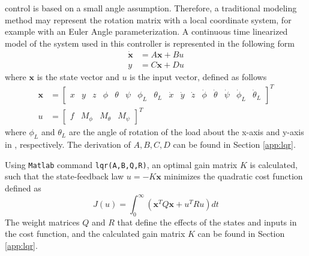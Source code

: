  control is based on a small angle assumption. Therefore, a traditional modeling method may represent the rotation matrix with a local coordinate system, for example with an Euler Angle parameterization. 
A continuous time linearized model of the system used in this controller is represented in the following form 
\begin{align}\label{eq:ss}
\mathbf{\dot{x} }&=A\mathbf{x}+Bu\\
y&=C\mathbf{x}+Du
\end{align}
where $ \mathbf{x} $ is the state vector and $ u $ is the input vector, defined as follows
\begin{align}\label{eq:state}
\mathbf{x}&=\begin{bmatrix}
x&y&z&\phi&\theta&\psi&\phi_L&\theta_L&\dot{x}&\dot{y}&\dot{z}&\dot{\phi}&\dot{\theta}&\dot{\psi}&\dot{\phi}_L&\dot{\theta}_L
\end{bmatrix}^T\\
	u&=\begin{bmatrix}
		f&M_\phi&M_\theta&M_\psi
	\end{bmatrix}^T
\end{align}
where $ \phi_L $ and $ \theta_L $ are the angle of rotation of the load about the x-axis and y-axis in \BF, respectively.
The derivation of $ A, B, C, D $ can be found in Section \ref{app:lqr}. 

Using \texttt{Matlab} command \texttt{lqr(A,B,Q,R)}, an optimal gain matrix $ K $ is calculated, such that the state-feedback law $ u=-K\mathbf{x} $ minimizes the quadratic cost function defined as
\begin{equation}\label{key}
J(u)=\int_{0}^{\infty}(\mathbf{x}^TQ\mathbf{x}+u^TRu)dt
\end{equation}
The weight matrices $ Q $ and $ R $ that define the effects of the states and inputs in the cost function, and the calculated gain matrix $K $ can be found in Section \ref{app:lqr}. 

